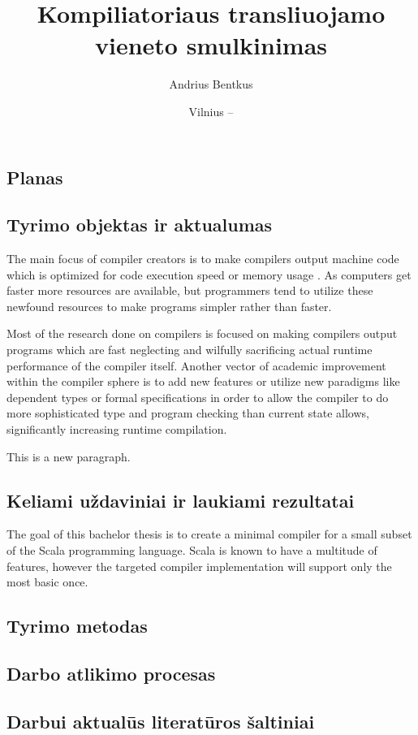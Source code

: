 \documentclass{VUMIFPSbakalaurinis}
\institute{Informatikos institutas}  %
\title{Kompiliatoriaus transliuojamo vieneto smulkinimas}
\author{Andrius Bentkus}
\date{Vilnius – \the\year}
\begin{document}
\maketitle


\begin{samepage}
\section{Planas}
\subsection{Tyrimo objektas ir aktualumas}
The main focus of compiler creators is to make compilers output machine code which is optimized for code execution speed or memory usage \cite{lopes2018future}.
As computers get faster more resources are available, but programmers tend to utilize these newfound resources to make programs simpler rather than faster.

Most of the research done on compilers is focused on making compilers output programs which are fast neglecting and wilfully sacrificing \cite{fast2019compilers} actual runtime performance of the compiler itself.
Another vector of academic improvement within the compiler sphere is to add new features or utilize new paradigms like dependent types or formal specifications in order to allow the compiler to do more sophisticated type and program checking than current state allows, significantly increasing runtime compilation.

This is a new paragraph.

\subsection{Keliami uždaviniai ir laukiami rezultatai}
The goal of this bachelor thesis is to create a minimal compiler for a small subset of the Scala programming language.
Scala is known to have a multitude of features, however the targeted compiler implementation will support only the most basic once.

\subsection{Tyrimo metodas}
\subsection{Darbo atlikimo procesas}
\subsection{Darbui aktualūs literatūros šaltiniai}
\end{samepage}
\end{document}
